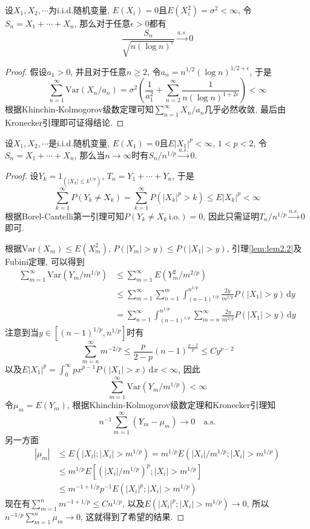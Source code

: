 \documentclass[cn, 12pt, math=mtpro2, bibstyle=apa, blue, twocol]{elegantbook}
\begin{document}
\begin{theorem}
  设$X_1,X_2,\cdots$为i.i.d.随机变量, $E(X_i)=0$且$E(X_i^2)=\sigma^2<\infty$, 令$S_n=X_1+\cdots+X_n$, 那么对于任意$\epsilon>0$都有
  $$\frac{S_n}{\sqrt{n(\log n)^\epsilon }}\xrightarrow{a.s.}0$$
\end{theorem}
\begin{proof}
  假设$a_1>0$, 并且对于任意$n\ge2$, 令$a_n=n^{1/2}(\log n)^{1/2+\epsilon}$, 于是
  $$\sum_{n=1}^{\infty}\text{Var}(X_n/a_n)=\sigma^2\left(\frac{1}{a_1^2}+\sum_{n=2}^{\infty}\frac{1}{n(\log n)^{1+2\epsilon}}\right)<\infty$$
  根据Khinchin-Kolmogorov级数定理可知$\sum_{n=1}^{\infty}X_n/a_n$几乎必然收敛, 最后由Kronecker引理即可证得结论.
\end{proof}

\begin{theorem}
  设$X_1,X_2,\cdots$是i.i.d.随机变量, $E(X_1)=0$且$E|X_1|^p<\infty$, $1<p<2$, 令$S_n=X_1+\cdots+X_n$, 那么当$n\to\infty$时有$S_n/n^{1/p}\xrightarrow{a.s.}0$.
\end{theorem}
\begin{proof}
  设$Y_k=1_{(|X_k|\leq k^{1/p})}$, $T_n=Y_1+\cdots+Y_n$, 于是
  $$\sum_{k=1}^{\infty}P(Y_k\neq X_k)=\sum_{k=1}^{\infty}P(|X_k|^p>k)\leq E|X_k|^p<\infty$$
  根据Borel-Cantelli第一引理可知$P(Y_k\neq X_k\,\text{i.o.})=0$, 因此只需证明$T_n/n^{1/p}\xrightarrow{a.s.}0$即可.

  根据$\text{Var}(X_m)\leq E(X_m^2)$, $P(|Y_m|>y)\leq P(|X_1|>y)$, 引理\ref{lem:lem2.2}及Fubini定理, 可以得到
  \begin{align*}
  \sum_{m=1}^{\infty}\text{Var}(Y_m/m^{1/p})&\leq \sum_{m=1}^{\infty}E(Y_m^2/m^{2/p}) \\
  &\leq \sum_{m=1}^{\infty}\sum_{n=1}^{m}\int_{(n-1)^{1/p}}^{n^{1/p}}\frac{2y}{m^{2/p}}P(|X_1|>y)\,\text{d}y \\
  &=\sum_{n=1}^{\infty}\int_{(n-1)^{1/p}}^{n^{1/p}}\sum_{m=n}^{\infty}\frac{2y}{m^{2/p}}P(|X_1|>y)\,\text{d}y
  \end{align*}
  注意到当$y\in [(n-1)^{1/p},n^{1/p}]$时有
  $$\sum_{m=n}^{\infty}m^{-2/p}\leq \frac{p}{2-p}(n-1)^{\frac{p-2}{p}}\leq Cy^{p-2}$$
  以及$E|X_1|^p=\int_{0}^{\infty}px^{p-1}P(|X_1|>x)\,\text{d}x<\infty$, 因此
  $$\sum_{m=1}^{\infty}\text{Var}(Y_m/m^{1/p})<\infty$$
  令$\mu_m=E(Y_m)$, 根据Khinchin-Kolmogorov级数定理和Kronecker引理知
  $$n^{-1}\sum_{m=1}^{\infty}(Y_m-\mu_m)\to0\quad \text{a.s.}$$
  另一方面
  \begin{align*}
  |\mu_m|&\leq E(|X_i|;|X_i|>m^{1/p})=m^{1/p}E(|X_i|/m^{1/p};|X_i|>m^{1/p}) \\
  &\leq m^{1/p}E[(|X_i|/m^{1/p})^p; |X_i|>m^{1/p}] \\
  &\leq m^{-1+1/p}p^{-1}E(|X_i|^p; |X_i|>m^{1/p})
  \end{align*}
  现在有$\sum_{m=1}^{n}m^{-1+1/p}\leq Cn^{1/p}$, 以及$E(|X_i|^p; |X_i|>m^{1/p}) \to0$, 所以$n^{-1/p}\sum_{m=1}^{n}\mu_m\to0$, 这就得到了希望的结果.

\end{proof}
\end{document}
